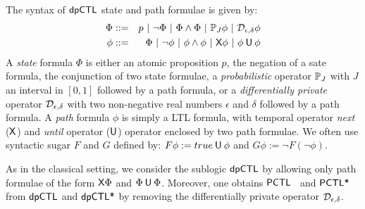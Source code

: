
The syntax of $\textsf{dpCTL}$ state and path formulae is given by:
\begin{eqnarray*}
  \Phi & ::= & p \ |\ \neg \Phi \ |\ \Phi \wedge \Phi \ |\
               \PJ{J} \phi \ |\ \dpriv{\epsilon}{\delta} \phi\\
  \phi & ::= & \Phi \ |\ \neg\phi  \ |\  \phi\wedge\phi  \ |\  \X \phi \ |\ \phi \until \phi
\end{eqnarray*}
A \emph{state} formula $\Phi$ is either  an atomic proposition
$p$, the negation of a sate formula, the conjunction of two state
formulae, a \emph{probabilistic} operator $\mathbb{P}_{J}$ with $J$
an interval in $[0, 1]$ followed by a path formula, or a
\emph{differentially private} operator $\mathcal{D}_{{\epsilon}, {\delta}}$
 with two non-negative real numbers $\epsilon$ and $\delta$ followed
 by a path formula. A
\emph{path} formula $\phi$ is simply a LTL formula, with temporal operator \emph{next}  ($\mathsf{X}$)
and  \emph{until} operator
($\mathbin{\mathsf{U}}$) operator enclosed by two path formulae.
We often use syntactic sugar $F$ and $G$ defined by: $F \phi:= true \mathbin{\mathsf{U}} \phi$ and $G\phi :=\neg F (\neg\phi)$.

As in the classical setting, we consider the sublogic $\textsf{dpCTL}$ by allowing only path formulae of the form $\mathsf{X}\Phi$ and $\Phi\mathbin{\mathsf{U}}\Phi$.
Moreover, one obtains $\textsf{PCTL}$~\cite{HanssonJ94} and $\textsf{PCTL*}$~\cite{BiancoA95} from $\textsf{dpCTL}$ and $\textsf{dpCTL*}$
by removing the differentially private operator  $\mathcal{D}_{{\epsilon}, {\delta}}$.

